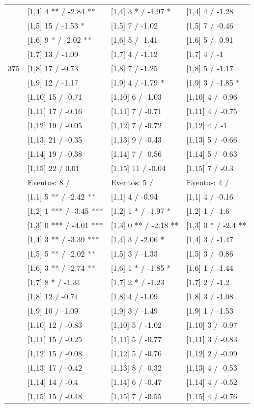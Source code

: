 \begin{table}
\begin{tabular}[t]{llll}
\addlinespace
 & {}[1,4] 4 ** / -2.84 ** & {}[1,4] 3 * / -1.97 * & {}[1,4] 4  / -1.28\\
 & {}[1,5] 15  / -1.53 * & {}[1,5] 7  / -1.02 & {}[1,5] 7  / -0.46\\
 & {}[1,6] 9 * / -2.02 ** & {}[1,6] 5  / -1.41 & {}[1,6] 5  / -0.91\\
 & {}[1,7] 13  / -1.09 & {}[1,7] 4  / -1.12 & {}[1,7] 4  / -1\\
375 & {}[1,8] 17  / -0.73 & {}[1,8] 7  / -1.25 & {}[1,8] 5  / -1.17\\
\addlinespace
 & {}[1,9] 12  / -1.17 & {}[1,9] 4  / -1.79 * & {}[1,9] 3  / -1.85 *\\
 & {}[1,10] 15  / -0.71 & {}[1,10] 6  / -1.03 & {}[1,10] 4  / -0.96\\
 & {}[1,11] 17  / -0.16 & {}[1,11] 7  / -0.71 & {}[1,11] 4  / -0.75\\
 & {}[1,12] 19  / -0.05 & {}[1,12] 7  / -0.72 & {}[1,12] 4  / -1\\
 & {}[1,13] 21  / -0.35 & {}[1,13] 9  / -0.43 & {}[1,13] 5  / -0.66\\
\addlinespace
 & {}[1,14] 19  / -0.38 & {}[1,14] 7  / -0.56 & {}[1,14] 5  / -0.63\\
 & {}[1,15] 22  / 0.01 & {}[1,15] 11  / -0.04 & {}[1,15] 7  / -0.3\\
 & Eventos:  8 / & Eventos:  5 / & Eventos:  4 /\\
 & {}[1,1] 5 ** / -2.42 ** & {}[1,1] 4  / -0.94 & {}[1,1] 4  / -0.16\\
 & {}[1,2] 1 *** / -3.45 *** & {}[1,2] 1 * / -1.97 * & {}[1,2] 1  / -1.6\\
\addlinespace
 & {}[1,3] 0 *** / -4.01 *** & {}[1,3] 0 ** / -2.18 ** & {}[1,3] 0 * / -2.4 **\\
 & {}[1,4] 3 ** / -3.39 *** & {}[1,4] 3  / -2.06 * & {}[1,4] 3  / -1.47\\
 & {}[1,5] 5 ** / -2.02 ** & {}[1,5] 3  / -1.33 & {}[1,5] 3  / -0.86\\
 & {}[1,6] 3 ** / -2.74 ** & {}[1,6] 1 * / -1.85 * & {}[1,6] 1  / -1.44\\
 & {}[1,7] 8 * / -1.31 & {}[1,7] 2 * / -1.23 & {}[1,7] 2  / -1.2\\
\addlinespace
500 & {}[1,8] 12  / -0.74 & {}[1,8] 4  / -1.09 & {}[1,8] 3  / -1.08\\
 & {}[1,9] 10  / -1.09 & {}[1,9] 3  / -1.49 & {}[1,9] 1  / -1.53\\
 & {}[1,10] 12  / -0.83 & {}[1,10] 5  / -1.02 & {}[1,10] 3  / -0.97\\
 & {}[1,11] 15  / -0.25 & {}[1,11] 5  / -0.77 & {}[1,11] 3  / -0.83\\
 & {}[1,12] 15  / -0.08 & {}[1,12] 5  / -0.76 & {}[1,12] 2  / -0.99\\
\addlinespace
 & {}[1,13] 17  / -0.42 & {}[1,13] 8  / -0.32 & {}[1,13] 4  / -0.53\\
 & {}[1,14] 14  / -0.4 & {}[1,14] 6  / -0.47 & {}[1,14] 4  / -0.52\\
 & {}[1,15] 15  / -0.48 & {}[1,15] 7  / -0.55 & {}[1,15] 4  / -0.76\\
\bottomrule
\end{tabular}
\end{table}
